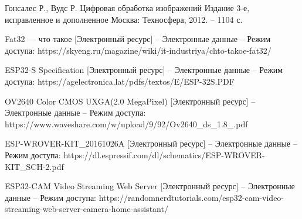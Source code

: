 \begin{thebibliography}{99}
    \setlength{\itemindent}{1.95cm} %
    \setlength{\leftmargin}{1.25cm} %
    \setlength{\labelsep}{2mm} %

    \raggedright%
    \justifying
     Гонсалес Р., Вудс Р.
    Цифровая обработка изображений Издание 3-е, исправленное и дополненное
    Москва: Техносфера, 2012. – 1104 с. 
    
     Fat32 — что такое [Электронный ресурс] – Электронные данные – Режим доступа: https://skyeng.ru/magazine/wiki/it-industriya/chto-takoe-fat32/
    
     ESP32-S Specification [Электронный ресурс] – Электронные данные – Режим доступа: https://agelectronica.lat/pdfs/textos/E/ESP-32S.PDF

     OV2640 Color CMOS UXGA(2.0 MegaPixel) [Электронный ресурс] – Электронные данные – Режим доступа: https://www.waveshare.com/w/upload/9/92/Ov2640\_ds\_1.8\_.pdf
    
     ESP-WROVER-KIT\_20161026A [Электронный ресурс] – Электронные данные – Режим доступа: https://dl.espressif.com/dl/schematics/ESP-WROVER-KIT\_SCH-2.pdf
    
     ESP32-CAM Video Streaming Web Server [Электронный ресурс] – Электронные данные – Режим доступа: https://randomnerdtutorials.com/esp32-cam-video-streaming-web-server-camera-home-assistant/


\end{thebibliography}
